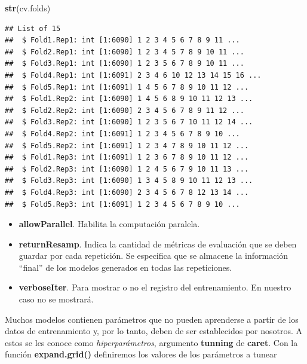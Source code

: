 \documentclass[]{article}
\newenvironment{Shaded}{\begin{snugshade}}{\end{snugshade}}
\newcommand{\KeywordTok}[1]{\textcolor[rgb]{0.13,0.29,0.53}{\textbf{#1}}}
\newcommand{\NormalTok}[1]{#1}
\providecommand{\tightlist}{%
  \setlength{\itemsep}{0pt}\setlength{\parskip}{0pt}}
\begin{document}
\vspace{2mm}

\begin{Shaded}
\begin{Highlighting}[]
\KeywordTok{str}\NormalTok{(cv.folds)}
\end{Highlighting}
\end{Shaded}

\begin{verbatim}
## List of 15
##  $ Fold1.Rep1: int [1:6090] 1 2 3 4 5 6 7 8 9 11 ...
##  $ Fold2.Rep1: int [1:6090] 1 2 3 4 5 7 8 9 10 11 ...
##  $ Fold3.Rep1: int [1:6090] 1 2 3 5 6 7 8 9 10 11 ...
##  $ Fold4.Rep1: int [1:6091] 2 3 4 6 10 12 13 14 15 16 ...
##  $ Fold5.Rep1: int [1:6091] 1 4 5 6 7 8 9 10 11 12 ...
##  $ Fold1.Rep2: int [1:6090] 1 4 5 6 8 9 10 11 12 13 ...
##  $ Fold2.Rep2: int [1:6090] 2 3 4 5 6 7 8 9 11 12 ...
##  $ Fold3.Rep2: int [1:6090] 1 2 3 5 6 7 10 11 12 14 ...
##  $ Fold4.Rep2: int [1:6091] 1 2 3 4 5 6 7 8 9 10 ...
##  $ Fold5.Rep2: int [1:6091] 1 2 3 4 7 8 9 10 11 12 ...
##  $ Fold1.Rep3: int [1:6091] 1 2 3 6 7 8 9 10 11 12 ...
##  $ Fold2.Rep3: int [1:6090] 1 2 4 5 6 7 9 10 11 13 ...
##  $ Fold3.Rep3: int [1:6090] 1 3 4 5 8 9 10 11 12 13 ...
##  $ Fold4.Rep3: int [1:6090] 2 3 4 5 6 7 8 12 13 14 ...
##  $ Fold5.Rep3: int [1:6091] 1 2 3 4 5 6 7 8 9 10 ...
\end{verbatim}

\vspace{2mm}

\begin{itemize}
\tightlist
\item
  \textbf{allowParallel}. Habilita la computación paralela. 

\item
  \textbf{returnResamp}. Indica la cantidad de métricas de evaluación que se deben guardar por cada repetición. Se especifica que se almacene la información ``final'' de los modelos generados en todas las repeticiones. 
  
\item
  \textbf{verboseIter}. Para mostrar o no el registro del entrenamiento. En nuestro caso no se mostrará.
\end{itemize}

Muchos modelos contienen parámetros que no pueden aprenderse a partir de
los datos de entrenamiento y, por lo tanto, deben de ser establecidos
por nosotros. A estos se les conoce como \emph{hiperparámetros},
argumento \textbf{tunning} de \textbf{caret}. Con la función
\textbf{expand.grid()} definiremos los valores de los parámetros a tunear
\end{document}
